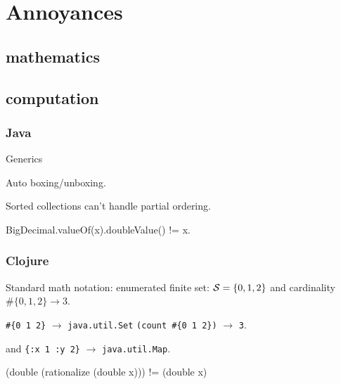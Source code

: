 \chapter{Annoyances}

\section{mathematics}

\section{computation}

\subsection{Java}
\lstset{language=Java}

Generics

Auto boxing/unboxing.

Sorted collections can't handle partial ordering.

BigDecimal.valueOf(x).doubleValue() != x.

\subsection{Clojure}
\lstset{language=Clojure}

Standard math notation: 
enumerated finite set: $\mathcal{S} = \{0, 1, 2\}$ 
and cardinality $\#\{0, 1, 2\}
\rightarrow 3$.

\lstinline|#{0 1 2}| $\rightarrow$ \lstinline|java.util.Set|
\lstinline|(count #{0 1 2})| $\rightarrow$
\lstinline|3|.

and
\lstinline|{:x 1 :y 2}| $\rightarrow$ \lstinline|java.util.Map|.

(double (rationalize (double x))) != (double x)